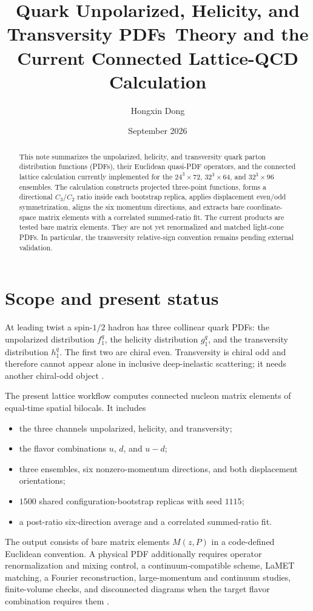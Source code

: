 \documentclass[11pt]{article}
\title{\textbf{Quark Unpolarized, Helicity, and Transversity PDFs}\
\large Theory and the Current Connected Lattice-QCD Calculation}
\author{Hongxin Dong}
\date{September 2026}
\numberwithin{equation}{section}
\begin{document}
\maketitle

\begin{abstract}
This note summarizes the unpolarized, helicity, and transversity quark
parton distribution functions (PDFs), their Euclidean quasi-PDF operators,
and the connected lattice calculation currently implemented for the
$24^3\!\times72$, $32^3\!\times64$, and $32^3\!\times96$ ensembles.  The
calculation constructs projected three-point functions, forms a directional
$C_3/C_2$ ratio inside each bootstrap replica, applies displacement even/odd
symmetrization, aligns the six momentum directions, and extracts bare
coordinate-space matrix elements with a correlated summed-ratio fit.  The
current products are tested bare matrix elements.  They are not yet
renormalized and matched light-cone PDFs.  In particular, the transversity
relative-sign convention remains pending external validation.
\end{abstract}

\tableofcontents

\section{Scope and present status}

At leading twist a spin-$1/2$ hadron has three collinear quark PDFs:
the unpolarized distribution $f_1^q$, the helicity distribution $g_1^q$,
and the transversity distribution $h_1^q$.  The first two are chiral even.
Transversity is chiral odd and therefore cannot appear alone in inclusive
deep-inelastic scattering; it needs another chiral-odd object
\cite{ArtruMekhfi1990,JaffeJi1992,Collins2011}.

The present lattice workflow computes connected nucleon matrix elements of
equal-time spatial bilocals.  It includes
\begin{itemize}
  \item the three channels unpolarized, helicity, and transversity;
  \item the flavor combinations $u$, $d$, and $u-d$;
  \item three ensembles, six nonzero-momentum directions, and both
        displacement orientations;
  \item $1500$ shared configuration-bootstrap replicas with seed $1115$;
  \item a post-ratio six-direction average and a correlated summed-ratio fit.
\end{itemize}
The output consists of bare matrix elements $M(z,P)$ in a code-defined
Euclidean convention.  A physical PDF additionally requires operator
renormalization and mixing control, a continuum-compatible scheme, LaMET
matching, a Fourier reconstruction, large-momentum and continuum studies,
finite-volume checks, and disconnected diagrams when the target flavor
combination requires them \cite{Ji2013,Xiong2014,Izubuchi2018,
CichyConstantinou2019}.
\end{document}
